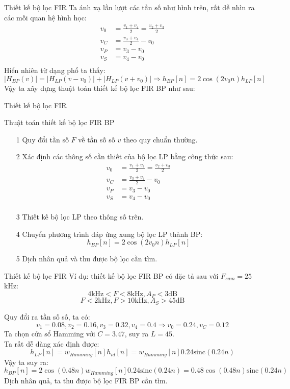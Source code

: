 \documentclass[8pt]{beamer}
\begin{document}
\begin{frame}{Thiết kế bộ lọc FIR}
	Ta ánh xạ lần lượt các tần số như hình trên, rất dễ nhìn ra các mối quan hệ hình học:
	\begin{equation*}
		\begin{split}
			v_{0}&=\frac{v_{1}+v_{4}}{2}=\frac{v_{2}+v_{3}}{2}\\
			v_{C}&=\frac{v_{3}+v_{4}}{2}-v_{0}\\
			v_{P}&=v_{3}-v_{0}\\
			v_{S}&=v_{4}-v_{0}\\
		\end{split}
	\end{equation*}
	Hiển nhiên từ dạng phổ ta thấy:
	$$|H_{BP}(v)|=|H_{LP}(v-v_{0})|+|H_{LP}(v+v_{0})|\Rightarrow h_{BP}[n]=2\cos({2v_{0}n})h_{LP}[n]$$
	Vậy ta xây dựng thuật toán thiết kế bộ lọc FIR BP như sau:
\end{frame}
\begin{frame}{Thiết kế bộ lọc FIR}
	\begin{block}{Thuật toán thiết kế bộ lọc FIR BP}
		\begin{enumerate}
			\item[1] Quy đổi tần số $F$ về tần số số $v$ theo quy chuẩn thường.
			\item[2] Xác định các thông số cần thiết của bộ lọc LP bằng công thức sau:
				\begin{equation*}
					\begin{split}
						v_{0}&=\frac{v_{1}+v_{4}}{2}=\frac{v_{2}+v_{3}}{2}\\
						v_{C}&=\frac{v_{3}+v_{4}}{2}-v_{0}\\
						v_{P}&=v_{3}-v_{0}\\
						v_{S}&=v_{4}-v_{0}\\
					\end{split}
				\end{equation*}
			\item[3] Thiết kế bộ lọc LP theo thông số trên.
			\item[4] Chuyển phương trình đáp ứng xung bộ lọc LP thành BP:
				$$h_{BP}[n]=2\cos({2v_{0}n})h_{LP}[n]$$
			\item[5] Dịch nhân quả và thu được bộ lọc cần tìm.

		\end{enumerate}
	\end{block}
\end{frame}
\begin{frame}{Thiết kế bộ lọc FIR}
	Ví dụ: thiết kế bộ lọc FIR BP có đặc tả sau với $F_{sam}=25$kHz:
	$$4\text{kHz}<F<8\text{kHz},A_{P}<3\text{dB}$$
	$$F<2\text{kHz},F>10\text{kHz},A_{S}>45\text{dB}$$

	Quy đổi ra tần số số, ta có:
	$$v_{1}=0.08,v_{2}=0.16,v_{3}=0.32,v_{4}=0.4\Rightarrow v_{0}=0.24,v_{C}=0.12$$
	Ta chọn cửa sổ Hamming với $C=3.47$, suy ra $L=45$.
	\\ Ta rất dễ dàng xác định được: $$h_{LP}[n]=w_{Hamming}[n]h_{id}[n]=w_{Hamming}[n]0.24\text{sinc}(0.24n)$$
	Vậy ta suy ra: $$h_{BP}[n]=2\cos(0.48n)w_{Hamming}[n]0.24\text{sinc}(0.24n)=0.48\cos(0.48n)\text{sinc}(0.24n)$$
	Dịch nhân quả, ta thu được bộ lọc FIR BP cần tìm.
\end{frame}
\end{document}

